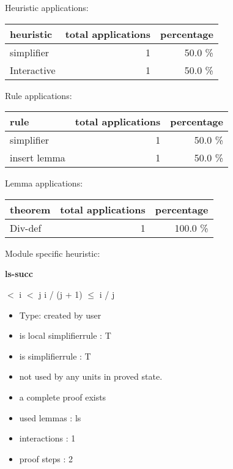 \documentclass[a4paper]{article}
\begin{document}
\medskip


Heuristic applications:

\begin{supertabular}{l|r|r}
heuristic	& total applications & percentage \\ \hline
simplifier & 1 & 50.0 \% \\
Interactive & 1 & 50.0 \% \\

\end{supertabular}

Rule applications:

\begin{supertabular}{l|r|r}
rule	        & total applications & percentage \\ \hline
simplifier & 1 & 50.0 \% \\
insert lemma & 1 & 50.0 \% \\

\end{supertabular}

Lemma applications:

\begin{supertabular}{l|r|r}
theorem	        & total applications & percentage \\ \hline
Div-def & 1 & 100.0 \% \\

\end{supertabular}

Module specific heuristic:

\pagebreak

{\LARGE\bf ls-succ}\label{lemma-ls-succ}

\medskip

  $<$ i  $<$ j \Imp i / (j + 1) $\le$ i / j

\begin{itemize}

\item Type: created by user

\item is local simplifierrule : T
\item is simplifierrule : T
\item not used by any units in proved state.
\item       a complete proof exists
\item       used lemmas  : ls
\item       interactions : 1
\item       proof steps  : 2
\end{itemize}
\end{document}
